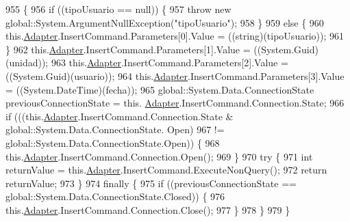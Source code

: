\begin{DoxyCode}
955                                                                                                            
                 \{
956             \textcolor{keywordflow}{if} ((tipoUsuario == null)) \{
957                 \textcolor{keywordflow}{throw} \textcolor{keyword}{new} global::System.ArgumentNullException(\textcolor{stringliteral}{"tipoUsuario"});
958             \}
959             \textcolor{keywordflow}{else} \{
960                 this.\hyperlink{class_proyecto___integrador__3_1_1ds_servicios_table_adapters_1_1_servicios_table_adapter_a6e2d84a1b2c925ab5f078c403b1e3ecf}{Adapter}.InsertCommand.Parameters[0].Value = ((string)(tipoUsuario));
961             \}
962             this.\hyperlink{class_proyecto___integrador__3_1_1ds_servicios_table_adapters_1_1_servicios_table_adapter_a6e2d84a1b2c925ab5f078c403b1e3ecf}{Adapter}.InsertCommand.Parameters[1].Value = ((System.Guid)(unidad));
963             this.\hyperlink{class_proyecto___integrador__3_1_1ds_servicios_table_adapters_1_1_servicios_table_adapter_a6e2d84a1b2c925ab5f078c403b1e3ecf}{Adapter}.InsertCommand.Parameters[2].Value = ((System.Guid)(usuario));
964             this.\hyperlink{class_proyecto___integrador__3_1_1ds_servicios_table_adapters_1_1_servicios_table_adapter_a6e2d84a1b2c925ab5f078c403b1e3ecf}{Adapter}.InsertCommand.Parameters[3].Value = ((System.DateTime)(fecha));
965             global::System.Data.ConnectionState previousConnectionState = this.
      \hyperlink{class_proyecto___integrador__3_1_1ds_servicios_table_adapters_1_1_servicios_table_adapter_a6e2d84a1b2c925ab5f078c403b1e3ecf}{Adapter}.InsertCommand.Connection.State;
966             \textcolor{keywordflow}{if} (((this.\hyperlink{class_proyecto___integrador__3_1_1ds_servicios_table_adapters_1_1_servicios_table_adapter_a6e2d84a1b2c925ab5f078c403b1e3ecf}{Adapter}.InsertCommand.Connection.State & global::System.Data.ConnectionState.
      Open) 
967                         != global::System.Data.ConnectionState.Open)) \{
968                 this.\hyperlink{class_proyecto___integrador__3_1_1ds_servicios_table_adapters_1_1_servicios_table_adapter_a6e2d84a1b2c925ab5f078c403b1e3ecf}{Adapter}.InsertCommand.Connection.Open();
969             \}
970             \textcolor{keywordflow}{try} \{
971                 \textcolor{keywordtype}{int} returnValue = this.\hyperlink{class_proyecto___integrador__3_1_1ds_servicios_table_adapters_1_1_servicios_table_adapter_a6e2d84a1b2c925ab5f078c403b1e3ecf}{Adapter}.InsertCommand.ExecuteNonQuery();
972                 \textcolor{keywordflow}{return} returnValue;
973             \}
974             \textcolor{keywordflow}{finally} \{
975                 \textcolor{keywordflow}{if} ((previousConnectionState == global::System.Data.ConnectionState.Closed)) \{
976                     this.\hyperlink{class_proyecto___integrador__3_1_1ds_servicios_table_adapters_1_1_servicios_table_adapter_a6e2d84a1b2c925ab5f078c403b1e3ecf}{Adapter}.InsertCommand.Connection.Close();
977                 \}
978             \}
979         \}
\end{DoxyCode}
